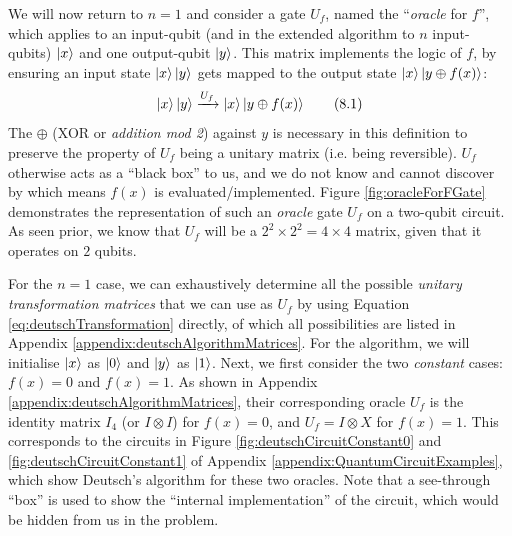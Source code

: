 \documentclass[conference]{IEEEtran}
\begin{document}
We will now return to $n=1$ and consider a gate $U_{f}$, named the ``\textit{oracle} for $f$'',
which applies to an input-qubit (and in the extended algorithm to $n$ input-qubits) $\ket{x}$ and one output-qubit $\ket{y}$.
This matrix implements the logic of $f$, by ensuring an input state $\ket{x}\ket{y}$
gets mapped to the output state $\ket{x}\ket{y \oplus f(x)}$:
\begin{equation}
    \ket{x}\ket{y} \xrightarrow{U_{f}} \ket{x}\ket{y \oplus f(x)} \tag{8.1} \label{eq:deutschTransformation}
\end{equation}
The $\oplus$ (XOR or \textit{addition mod 2}) against $y$ is necessary in this definition to preserve
the property of $U_{f}$ being a unitary matrix
(i.e. being reversible).
$U_{f}$ otherwise acts as a ``black box'' to us, and we do not know and cannot discover by which means $f(x)$ is evaluated/implemented.
Figure \ref{fig:oracleForFGate} demonstrates the representation of such an \textit{oracle} gate $U_{f}$ on a two-qubit circuit.
As seen prior, we know that $U_{f}$ will be a $2^2 \times 2^2 =4\times 4$ matrix, given that it operates on $2$ qubits.

For the $n=1$ case, we can exhaustively determine all the possible \textit{unitary transformation matrices}
that we can use as $U_{f}$ by using Equation \ref{eq:deutschTransformation} directly,
of which all possibilities are listed in Appendix \ref{appendix:deutschAlgorithmMatrices}.
For the algorithm, we will initialise $\ket{x}$ as $\ket{0}$ and $\ket{y}$ as $\ket{1}$.
Next, we first consider the two \textit{constant} cases: $f(x)=0$ and $f(x)=1$.
As shown in Appendix \ref{appendix:deutschAlgorithmMatrices}, their corresponding oracle $U_f$ is the
identity matrix $I_4$ (or $I \otimes I$) for $f(x)=0$, and $U_f = I \otimes X$ for $f(x) = 1$.
This corresponds to the circuits in Figure \ref{fig:deutschCircuitConstant0} and \ref{fig:deutschCircuitConstant1} of Appendix \ref{appendix:QuantumCircuitExamples},
which show Deutsch's algorithm for these two oracles.
Note that a see-through ``box'' is used to show the ``internal implementation'' of the circuit,
which would be hidden from us in the problem.
\end{document}

